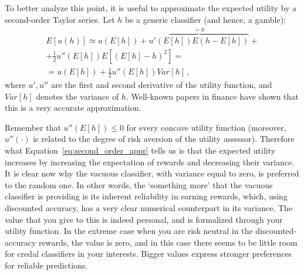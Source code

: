 \documentclass[a4paper,10pt,reqno]{amsart}
\theoremstyle{remark}
\begin{document}
To better analyze this point, it is useful to approximate the expected utility  by a second-order Taylor series. Let $h$ be a generic classifier (and hence, a gamble):
\begin{gather}
E[u(h)] \simeq u(E[h])+\overbrace{u'(E[h])E(h-E[h])}^{=0}+\nonumber\\
+\frac{1}{2}
u''(E[h]) E\left[\left(E[h]-h\right)^{2}\right]=\nonumber\\
= u(E[h])+\frac{1}{2}u''(E[h])Var[h] \, ,\label{eq:second_order_appr}
\end{gather}
where $u',u''$ are the first and second derivative of the utility function, and $Var[h]$ denotes the variance of $h$. Well-known papers in finance \cite {hlawitschka1994empirical,levy1979approximating} have shown that this is a very accurate approximation.

Remember that $u''(E[h])\le0$ for every concave utility function (moreover, $u''(\cdot)$ is related to the degree of risk aversion of the utility assessor). Therefore what Equation~\eqref{eq:second_order_appr} tells us is that the expected utility increases by increasing the expectation of rewards and decreasing their variance.  It is clear now why the vacuous classifier, with variance equal to zero, is preferred to the random one. In other words, the `something more' that the vacuous classifier is providing is its inherent reliability in earning rewards, which, using discounted accuracy, has a very clear numerical counterpart in its variance. The value that you give to this is indeed personal, and is formalized through your utility function. In the extreme case when you are risk neutral in the discounted-accuracy rewards, the value is zero, and in this case there seems to be little room for credal classifiers in your interests. Bigger values express stronger preferences for reliable predictions.
\end{document}
